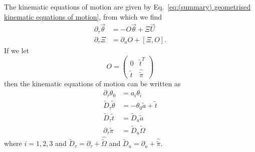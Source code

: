 The kinematic equations of motion are given by Eq.~\ref{eq:(summary) geometrised kinematic equations of motion}, from which we find
\begin{subequations}
\begin{align}
\partial_\tau \vec{\theta} & = - O \vec{\theta} + \Xi \vec{U} \\
\partial_\tau \Xi & = \partial_u O + [\Xi, O].
\end{align} 
\end{subequations}
If we let
\begin{equation}
O = \begin{pmatrix}
0 & \tilde{t}^T \\
\tilde{t} & \hat{\tilde{\pi}}
\end{pmatrix}
\end{equation}
then the kinematic equations of motion can be written as
\begin{subequations}
\begin{align}
\partial_\tau \theta_0 & = a_i \theta_i \\
\tilde{D}_\tau \tilde{\theta} & = - \theta_0 \tilde{a} + \tilde{t} \\
\tilde{D}_\tau \tilde{t} & = \tilde{D}_u \tilde{a} \\
\partial_\tau \tilde{\pi} & = \tilde{D}_u \tilde{\Omega}
\end{align} 
\end{subequations}
where $i = 1,2,3$ and $\tilde{D}_\tau = \partial_\tau + \hat{\tilde{\Omega}}$ and $\tilde{D}_u = \partial_u + \hat{\tilde{\pi}}$.










